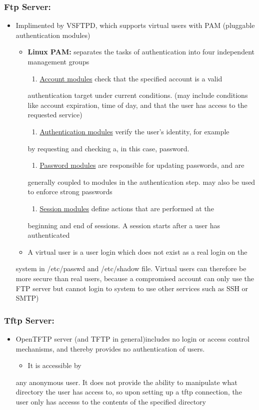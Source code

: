 \documentclass[11pt]{article}
\begin{document}
\subsubsection{Ftp Server:}
\label{sec-3-2-2}
\begin{itemize}
\item Implimented by VSFTPD, which supports virtual users with PAM (pluggable
authentication modules)
\begin{itemize}
\item \textbf{Linux PAM:} separates the tasks of authentication into four independent
management groups
\begin{enumerate}
\item \uline{Account modules} check that the specified account is a valid
\end{enumerate}
authentication target under current conditions. (may include
conditions like account expiration, time of day, and that the user
has access to the requested service)
\begin{enumerate}
\item \uline{Authentication modules} verify the user's identity, for example
\end{enumerate}
by requesting and checking a, in this case, password.
\begin{enumerate}
\item \uline{Password modules} are responsible for updating passwords, and are
\end{enumerate}
generally coupled to modules in the authentication step. may also be used 
to enforce strong passwords
\begin{enumerate}
\item \uline{Session modules} define actions that are performed at the
\end{enumerate}
beginning and end of sessions. A session starts after a user has
authenticated
\item A virtual user is a user login which does not exist as a real login on the
\end{itemize}
system in /etc/passwd and /etc/shadow file. Virtual users can therefore be
more secure than real users, because a compromised account can only use the
FTP server but cannot login to system to use other services such as SSH or
SMTP)
\end{itemize}
\subsubsection{Tftp Server:}
\label{sec-3-2-3}
\begin{itemize}
\item OpenTFTP server (and TFTP in general)includes no login or access control mechanisms, and thereby provides
no authentication of users. 
\begin{itemize}
\item It is accessible by
\end{itemize}
any anonymous user. It does not provide the ability to manipulate what
directory the user has access to, so upon setting up a tftp connection,
the user only has accesss to the contents of the specified directory
\end{itemize}
\end{document}
